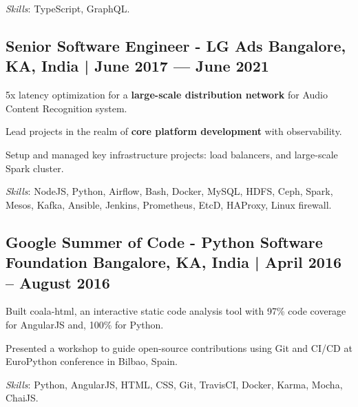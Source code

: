 \textit{Skills}: TypeScript, GraphQL.
\vspace*{1mm}

\subsection{{Senior Software Engineer - LG Ads \hfill Bangalore, KA, India | June 2017 --- June 2021}}
\begin{zitemize}
\item 5x latency optimization for a \textbf{large-scale distribution network} for Audio Content Recognition system.
\item Lead projects in the realm of \textbf{core platform development} with observability. 
\item Setup and managed key infrastructure projects: load balancers, and large-scale Spark cluster.
\end{zitemize}

\textit{Skills}: NodeJS, Python, Airflow, Bash, Docker, MySQL, HDFS, Ceph, Spark, Mesos, Kafka, Ansible, Jenkins, Prometheus, EtcD, HAProxy, Linux firewall.
\vspace*{1mm}

\subsection{{Google Summer of Code - Python Software Foundation \hfill Bangalore, KA, India | April 2016 -- August 2016}}
\begin{zitemize}
\item Built coala-html, an interactive static code analysis tool with 97\% code coverage for AngularJS and, 100\% for Python.
\item Presented a workshop to guide open-source contributions using Git and CI/CD at EuroPython conference in Bilbao, Spain.
\end{zitemize}
\textit{Skills}: Python, AngularJS, HTML, CSS, Git, TravisCI, Docker, Karma, Mocha, ChaiJS.
